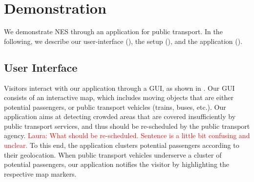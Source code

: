 \section{Demonstration}
\label{demo}
We demonstrate NES through an application for public transport. In the following, we describe our user-interface (), the setup (), and the application ().

\subsection{User Interface}
\label{subsec:user_interface}
Visitors interact with our application through a GUI, as shown in . Our GUI consists of an interactive map, which includes moving objects that are either potential passengers, or public transport vehicles (trains, buses, etc.). Our application aims at detecting crowded areas that are covered insufficiently by public transport services, and thus should be re-scheduled by the public transport agency. \textcolor{red}{Laura: What should be re-scheduled. Sentence is a little bit confusing and unclear.}
To this end, the application clusters potential passengers according to their geolocation. When public transport vehicles underserve a cluster of potential passengers, our application notifies the visitor by highlighting the respective map markers. 


